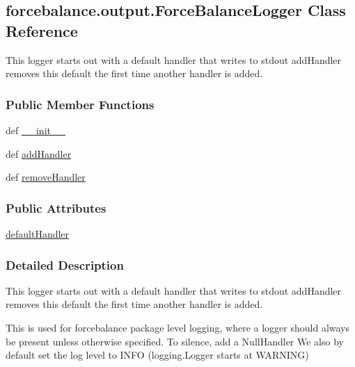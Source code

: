 \hypertarget{classforcebalance_1_1output_1_1ForceBalanceLogger}{\subsection{forcebalance.\-output.\-Force\-Balance\-Logger \-Class \-Reference}
\label{classforcebalance_1_1output_1_1ForceBalanceLogger}
}


\-This logger starts out with a default handler that writes to stdout add\-Handler removes this default the first time another handler is added.  


\subsubsection*{\-Public \-Member \-Functions}
\begin{DoxyCompactItemize}
\item 
def \hyperlink{classforcebalance_1_1output_1_1ForceBalanceLogger_aebc2ee02e48bab63b37dfbe1f8db5683}{\-\_\-\-\_\-init\-\_\-\-\_\-}
\item 
def \hyperlink{classforcebalance_1_1output_1_1ForceBalanceLogger_a7c6325e6fc8f6c99ef8ea9a3a3acff77}{add\-Handler}
\item 
def \hyperlink{classforcebalance_1_1output_1_1ForceBalanceLogger_ad8aa2fcfa32166607ee3d0cb0dcebd2d}{remove\-Handler}
\end{DoxyCompactItemize}
\subsubsection*{\-Public \-Attributes}
\begin{DoxyCompactItemize}
\item 
\hyperlink{classforcebalance_1_1output_1_1ForceBalanceLogger_abc9e80457d0e8d0eafce905309a7da45}{default\-Handler}
\end{DoxyCompactItemize}


\subsubsection{\-Detailed \-Description}
\-This logger starts out with a default handler that writes to stdout add\-Handler removes this default the first time another handler is added. 

\-This is used for forcebalance package level logging, where a logger should always be present unless otherwise specified. \-To silence, add a \-Null\-Handler \-We also by default set the log level to \-I\-N\-F\-O (logging.\-Logger starts at \-W\-A\-R\-N\-I\-N\-G) 

